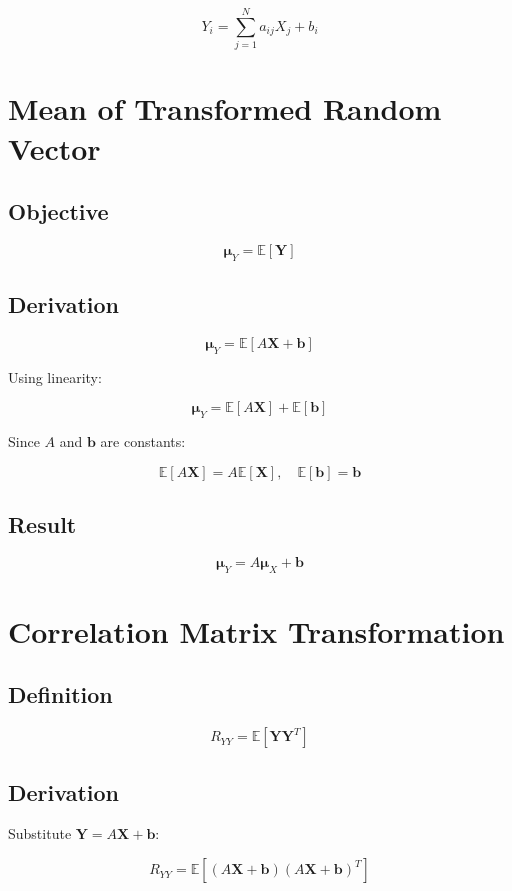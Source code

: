 \documentclass[11pt]{article}
\begin{document}
\[
Y_i = \sum_{j=1}^{N} a_{ij} X_j + b_i
\]

\section{Mean of Transformed Random Vector}

\subsection{Objective}

\[
\boldsymbol{\mu}_Y = \mathbb{E}[\mathbf{Y}]
\]

\subsection{Derivation}

\[
\boldsymbol{\mu}_Y = \mathbb{E}[A\mathbf{X} + \mathbf{b}]
\]

Using linearity:

\[
\boldsymbol{\mu}_Y = \mathbb{E}[A\mathbf{X}] + \mathbb{E}[\mathbf{b}]
\]

Since $A$ and $\mathbf{b}$ are constants:

\[
\mathbb{E}[A\mathbf{X}] = A\mathbb{E}[\mathbf{X}], \quad \mathbb{E}[\mathbf{b}] = \mathbf{b}
\]

\subsection{Result}

\[
\boxed{\boldsymbol{\mu}_Y = A\boldsymbol{\mu}_X + \mathbf{b}}
\]

\section{Correlation Matrix Transformation}

\subsection{Definition}

\[
R_{YY} = \mathbb{E}[\mathbf{Y}\mathbf{Y}^T]
\]

\subsection{Derivation}

Substitute $\mathbf{Y} = A\mathbf{X} + \mathbf{b}$:

\[
R_{YY} = \mathbb{E}[(A\mathbf{X} + \mathbf{b})(A\mathbf{X} + \mathbf{b})^T]
\]
\end{document}
